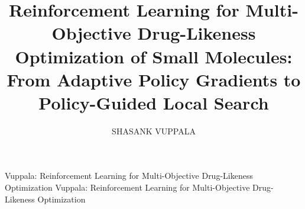 \documentclass{ieeeaccess}
\begin{document}
\setlength{\textfloatsep}{10pt plus 2pt minus 2pt}
\setlength{\intextsep}{10pt plus 2pt minus 2pt}
\setlength{\floatsep}{8pt plus 2pt minus 2pt}
\setlength{\dbltextfloatsep}{8pt plus 2pt minus 2pt}
\setlength{\dblfloatsep}{8pt plus 2pt minus 2pt}
\fnbelowfloat


\title{Reinforcement Learning for Multi-Objective Drug-Likeness Optimization of Small Molecules: From Adaptive Policy Gradients to Policy-Guided Local Search}

\author{\uppercase{Shasank Vuppala}}

\address[1]{Department of Computer Science and Engineering (Artificial Intelligence),
Amrita Vishwa Vidyapeetham, Amritapuri, Kerala, India
(Roll No.: AM.SC.U4AIE23064)}


\markboth
{Vuppala: Reinforcement Learning for Multi-Objective Drug-Likeness Optimization}
{Vuppala: Reinforcement Learning for Multi-Objective Drug-Likeness Optimization}

\end{document}
